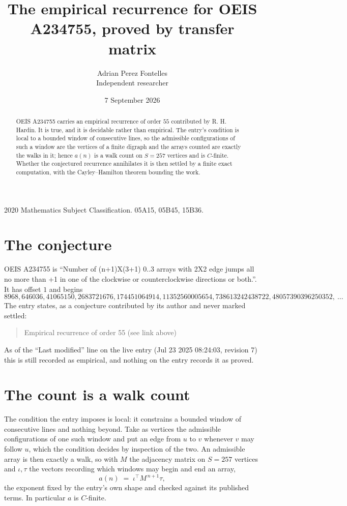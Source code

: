 \documentclass[11pt,a4paper]{article}
\title{The empirical recurrence for OEIS A234755, proved by transfer matrix}
\author{Adrian Perez Fontelles\\ \small Independent researcher}
\date{7 September 2026}
\theoremstyle{plain}
\theoremstyle{definition}
\begin{document}
\maketitle

\begin{abstract}
OEIS A234755 carries an empirical recurrence of order $55$ contributed by R. H. Hardin. It is
true, and it is decidable rather than empirical. The entry's condition is local to a bounded window of consecutive lines, so
the admissible configurations of such a window are the vertices of a finite digraph and the
arrays counted are exactly the walks in it; hence $a(n)$ is a walk count on $S=257$ vertices
and is $C$-finite. Whether the conjectured recurrence annihilates it is then settled by a
finite exact computation, with the Cayley--Hamilton theorem bounding the work.
\end{abstract}

\noindent\small 2020 Mathematics Subject Classification. 05A15, 05B45, 15B36.\normalsize

\section{The conjecture}

OEIS A234755 is ``Number of (n+1)X(3+1) 0..3 arrays with 2X2 edge jumps all no more than +1 in one of the clockwise or counterclockwise directions or both.''. It has offset $1$ and begins
\[
8968, 646036, 41065150, 2683721676, 174451064914, 11352560005654, 738613242438722, 48057390396250352,\ \dots
\]
The entry states, as a conjecture contributed by its author and never marked settled:
\begin{quote}
Empirical recurrence of order 55 (see link above)
\end{quote}
As of the ``Last modified'' line on the live entry (Jul 23 2025 08:24:03, revision 7) this is still
recorded as empirical, and nothing on the entry records it as proved.

\section{The count is a walk count}

The condition the entry imposes is local: it constrains a bounded window of consecutive lines and nothing beyond. Take as
vertices the admissible configurations of one such window and put an edge from $u$ to $v$
whenever $v$ may follow $u$, which the condition decides by inspection of the two. An
admissible array is then exactly a walk, so with $M$ the adjacency matrix on $S=257$ vertices
and $\iota,\tau$ the vectors recording which windows may begin and end an array,
\[
a(n)\;=\;\iota^{\!\top}M^{\,n+1}\tau ,
\]
the exponent fixed by the entry's own shape and checked against its published terms. In
particular $a$ is $C$-finite.
\end{document}
